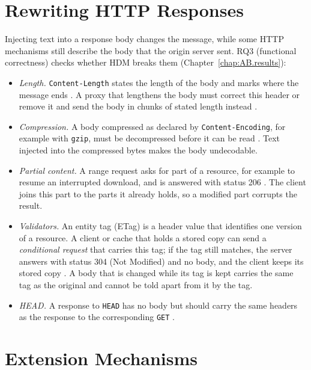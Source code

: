 \documentclass{rptuma}
\begin{document}
\section{Rewriting HTTP Responses}
\label{sec:bg.http}

Injecting text into a response body changes the message, while some HTTP mechanisms still describe
the body that the origin server sent. RQ3 (functional correctness) checks whether HDM breaks them
(Chapter~\ref{chap:AB.results}):
\begin{itemize}
  \item \emph{Length.} \texttt{Content-Length} states the length of the body and marks where the
    message ends \cite{rfc9110}. A proxy that lengthens the body must correct this header or
    remove it and send the body in chunks of stated length instead \cite{rfc9112}.
  \item \emph{Compression.} A body compressed as declared by \texttt{Content-Encoding}, for
    example with \texttt{gzip}, must be decompressed before it can be read \cite{rfc9110}. Text
    injected into the compressed bytes makes the body undecodable.
  \item \emph{Partial content.} A range request asks for part of a resource, for example to resume
    an interrupted download, and is answered with status 206 \cite{rfc9110}. The client joins this
    part to the parts it already holds, so a modified part corrupts the result.
  \item \emph{Validators.} An entity tag (ETag) is a header value that identifies one version of a
    resource. A client or cache that holds a stored copy can send a \emph{conditional request} that
    carries this tag; if the tag still matches, the server answers with status 304 (Not Modified)
    and no body, and the client keeps its stored copy \cite{rfc9110}. A body that is changed while
    its tag is kept carries the same tag as the original and cannot be told apart from it by the tag.
  \item \emph{HEAD.} A response to \texttt{HEAD} has no body but should carry the same headers as
    the response to the corresponding \texttt{GET} \cite{rfc9110}.
\end{itemize}

\section{Extension Mechanisms}
\label{sec:bg.platforms}
\end{document}
